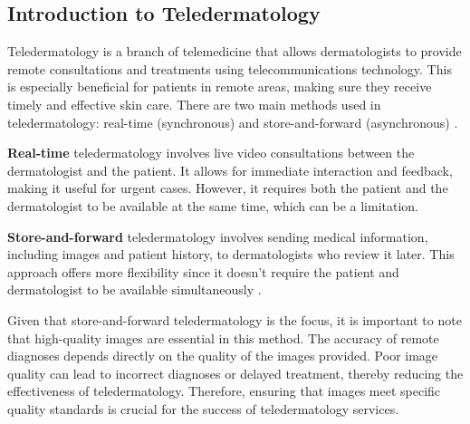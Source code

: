 \subsection{Introduction to Teledermatology}
\label{sub:IntroductionTeledermatology}
Teledermatology is a branch of telemedicine that allows dermatologists to provide remote consultations and treatments using telecommunications technology. This is especially beneficial for patients in remote areas, making sure they receive timely and effective skin care. There are two main methods used in teledermatology: real-time (synchronous) and store-and-forward (asynchronous) \autocite{SaF}.\par
\vspace{\baselineskip}
\noindent
\textbf{Real-time} teledermatology involves live video consultations between the dermatologist and the patient. It allows for immediate interaction and feedback, making it useful for urgent cases. However, it requires both the patient and the dermatologist to be available at the same time, which can be a limitation. \par
\vspace{\baselineskip}
\noindent
\textbf{Store-and-forward} teledermatology involves sending medical information, including images and patient history, to dermatologists who review it later. This approach offers more flexibility since it doesn’t require the patient and dermatologist to be available simultaneously \autocite{SaF}. \par
\vspace{\baselineskip}
\noindent
Given that store-and-forward teledermatology is the focus, it is important to note that high-quality images are essential in this method. The accuracy of remote diagnoses depends directly on the quality of the images provided. Poor image quality can lead to incorrect diagnoses or delayed treatment, thereby reducing the effectiveness of teledermatology. Therefore, ensuring that images meet specific quality standards is crucial for the success of teledermatology services. \par

